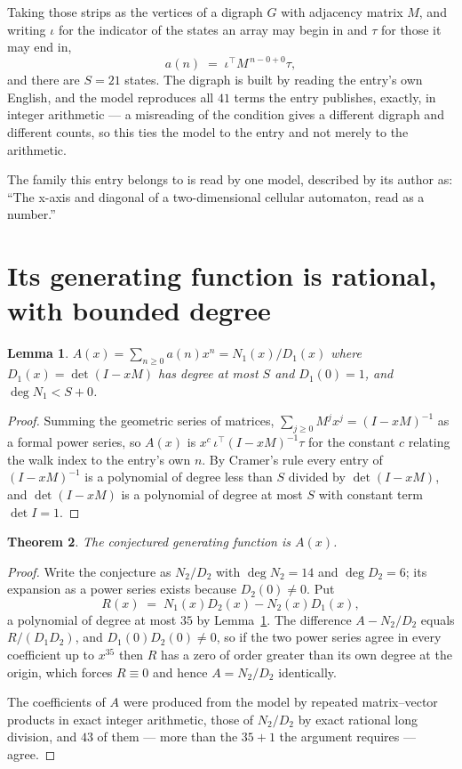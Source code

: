 \documentclass[11pt,a4paper]{article}
\theoremstyle{plain}
\newtheorem{theorem}{Theorem}
\newtheorem{lemma}[theorem]{Lemma}
\theoremstyle{definition}
\begin{document}
Taking those strips as the vertices of a digraph $G$ with adjacency matrix $M$, and writing
$\iota$ for the indicator of the states an array may begin in and $\tau$ for those it may end
in,
\[
a(n)\;=\;\iota^{\!\top}M^{\,n-0+0}\tau ,
\]
and there are $S=21$ states. The digraph is built by reading the entry's own English, and the
model reproduces all $41$ terms the entry publishes, exactly, in integer arithmetic --- a
misreading of the condition gives a different digraph and different counts, so this ties the
model to the entry and not merely to the arithmetic.

The family this entry belongs to is read by one model, described by its author as: ``The x-axis and diagonal of a two-dimensional cellular automaton, read as a number.''


\section{Its generating function is rational, with bounded degree}

\begin{lemma}\label{lem:rat}
$A(x)=\sum_{n\ge0}a(n)x^n=N_1(x)/D_1(x)$ where $D_1(x)=\det(I-xM)$ has degree at most
$S$ and $D_1(0)=1$, and $\deg N_1<S+0$.
\end{lemma}

\begin{proof}
Summing the geometric series of matrices, $\sum_{j\ge0}M^jx^j=(I-xM)^{-1}$ as a formal
power series, so $A(x)$ is $x^{c}\,\iota^{\!\top}(I-xM)^{-1}\tau$ for the constant $c$
relating the walk index to the entry's own $n$. By Cramer's rule every entry of
$(I-xM)^{-1}$ is a polynomial of degree less than $S$ divided by $\det(I-xM)$, and
$\det(I-xM)$ is a polynomial of degree at most $S$ with constant term $\det I=1$.
\end{proof}

\begin{theorem}
The conjectured generating function is $A(x)$.
\end{theorem}

\begin{proof}
Write the conjecture as $N_2/D_2$ with $\deg N_2=14$ and $\deg D_2=6$; its expansion as a
power series exists because $D_2(0)\neq0$. Put
\[
R(x)\;=\;N_1(x)D_2(x)-N_2(x)D_1(x),
\]
a polynomial of degree at most $35$ by Lemma~\ref{lem:rat}. The difference
$A-N_2/D_2$ equals $R/(D_1D_2)$, and $D_1(0)D_2(0)\neq0$, so if the two power series agree in
every coefficient up to $x^{35}$ then $R$ has a zero of order greater than its own
degree at the origin, which forces $R\equiv0$ and hence $A=N_2/D_2$ identically.

The coefficients of $A$ were produced from the model by repeated matrix--vector products in
exact integer arithmetic, those of $N_2/D_2$ by exact rational long division, and $43$
of them --- more than the $35+1$ the argument requires --- agree.
\end{proof}
\end{document}
